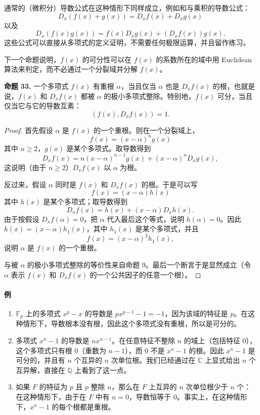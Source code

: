 通常的（微积分）导数公式在这种情形下同样成立，例如和与乘积的导数公式：
\[
D_x(f(x)+g(x))=D_xf(x)+D_xg(x)
\]
以及
\[
D_x(f(x)g(x))=f(x)D_xg(x)+(D_xf(x))g(x).
\]
这些公式可以直接从多项式的定义证明，不需要任何极限运算，并且留作练习。

下一个命题说明，$f(x)$ 的可分性可以在 $f(x)$ 的系数所在的域中用 Euclidean 算法来判定，而不必通过一个分裂域并分解 $f(x)$。

\noindent\textbf{命题 33.} 一个多项式 $f(x)$ 有重根 $\alpha$，当且仅当 $\alpha$ 也是 $D_xf(x)$ 的根，也就是说，$f(x)$ 和 $D_xf(x)$ 都被 $\alpha$ 的极小多项式整除。特别地，$f(x)$ 可分，当且仅当它与它的导数互素：
\[
(f(x),D_xf(x))=1.
\]

\begin{proof}
	首先假设 $\alpha$ 是 $f(x)$ 的一个重根。则在一个分裂域上，
	\[
	f(x)=(x-\alpha)^ng(x)
	\]
	其中 $n\geq 2$，$g(x)$ 是某个多项式。取导数得到
	\[
	D_xf(x)=n(x-\alpha)^{n-1}g(x)+(x-\alpha)^nD_xg(x),
	\]
	这说明（由于 $n\geq2$）$D_xf(x)$ 以 $\alpha$ 为根。
	
	反过来，假设 $\alpha$ 同时是 $f(x)$ 和 $D_xf(x)$ 的根。于是可以写
	\[
	f(x)=(x-\alpha)h(x)
	\]
	其中 $h(x)$ 是某个多项式；取导数得到
	\[
	D_xf(x)=h(x)+(x-\alpha)D_xh(x).
	\]
	由于按假设 $D_xf(\alpha)=0$，把 $\alpha$ 代入最后这个等式，说明 $h(\alpha)=0$。因此 $h(x)=(x-\alpha)h_1(x)$，其中 $h_1(x)$ 是某个多项式，并且
	\[
	f(x)=(x-\alpha)^2h_1(x),
	\]
	说明 $\alpha$ 是 $f(x)$ 的一个重根。
	
	与被 $\alpha$ 的极小多项式整除的等价性来自命题 9。最后一个断言于是显然成立（令 $\alpha$ 表示 $f(x)$ 和 $D_xf(x)$ 的一个公共因子的任意一个根）。
\end{proof}

\paragraph{例}
\begin{enumerate}[label=(\arabic*)]
	\item $\mathbb F_p$ 上的多项式 $x^p-x$ 的导数是 $px^{p-1}-1=-1$，因为该域的特征是 $p$。在这种情形下，导数根本没有根，因此这个多项式没有重根，所以是可分的。
	
	\item 多项式 $x^n-1$ 的导数是 $nx^{n-1}$。在任意特征不整除 $n$ 的域上（包括特征 $0$），这个多项式只有根 $0$（重数为 $n-1$），而 $0$ 不是 $x^n-1$ 的根。因此 $x^n-1$ 是可分的，并且有 $n$ 个互异的 $n$ 次单位根。我们已经通过在 $\mathbb C$ 上显式给出 $n$ 个互异解，直接在 $\mathbb Q$ 上看到了这一点。
	
	\item 如果 $F$ 的特征为 $p$ 且 $p$ 整除 $n$，那么在 $F$ 上互异的 $n$ 次单位根少于 $n$ 个：在这种情形下，由于在 $F$ 中有 $n=0$，导数恒等于 $0$。事实上，在这种情形下，$x^n-1$ 的每个根都是重根。
\end{enumerate}


